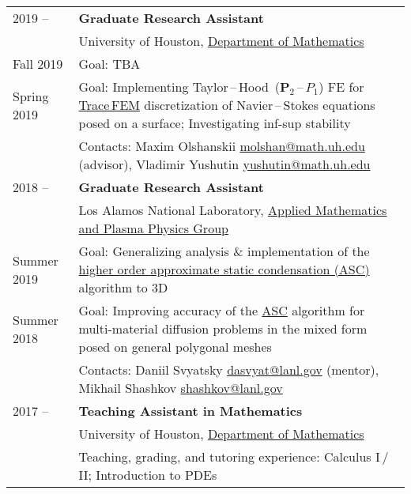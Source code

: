 \documentclass[a4paper,12pt]{article}
\begin{document}
	\begin{longtable}{ l >{\raggedright\arraybackslash}p{15cm} }
		2019 --
			& \textbf{Graduate Research Assistant} \vspace{1mm}\\
			& University of Houston, \href{http://www.uh.edu/nsm/math/}{Department of Mathematics} \vspace{1mm}\\
		Fall 2019
			& Goal: TBA \vspace{1mm}\\
		Spring 2019
			& Goal: Implementing Taylor\,--\,Hood~($\mathbf{P}_2$\,--\,$P_1$) FE for \href{https://www.math.uh.edu/~molshan/tracefinite.html}{Trace\,FEM} discretization of Navier\,--\,Stokes equations posed on a surface; Investigating inf-sup stability \vspace{1mm}\\
			& Contacts: Maxim Olshanskii \href{mailto:molshan@math.uh.edu}{molshan@math.uh.edu} (advisor), Vladimir Yushutin \href{mailto:yushutin@math.uh.edu}{yushutin@math.uh.edu} \vspace{3mm}\\
		2018 --
			& \textbf{Graduate Research Assistant} \vspace{1mm}\\
			& Los Alamos National Laboratory, \href{http://www.lanl.gov/org/padste/adtsc/theoretical/applied-mathematics-plasma-physics}{Applied Mathematics and Plasma Physics Group}\vspace{1mm}\\
		Summer 2019
			& Goal: Generalizing analysis \& implementation of the \href{https://www.researchgate.net/publication/330912268_A_higher_order_approximate_static_condensation_method_for_multi-material_diffusion_problems}{higher order approximate static condensation (ASC)} algorithm to 3D \vspace{1mm}\\
		Summer 2018
			& Goal: Improving accuracy of the \href{https://www.researchgate.net/publication/318300724_Approximate_static_condensation_algorithm_for_solving_multi-material_diffusion_problems_on_meshes_non-aligned_with_material_interfaces}{ASC} algorithm for multi-material diffusion problems in the mixed form posed on general polygonal meshes \vspace{1mm}\\
			& Contacts: Daniil Svyatsky \href{mailto:dasvyat@lanl.gov}{dasvyat@lanl.gov} (mentor), Mikhail Shashkov \href{mailto:shashkov@lanl.gov}{shashkov@lanl.gov} \vspace{3mm}\\
		2017 --
			& \textbf{Teaching Assistant in Mathematics} \vspace{1mm}\\
			& University of Houston, \href{http://www.uh.edu/nsm/math/}{Department of Mathematics} \vspace{1mm}\\
			& Teaching, grading, and tutoring experience: Calculus I\,/\,II; Introduction to PDEs
	\end{longtable}
\end{document}
